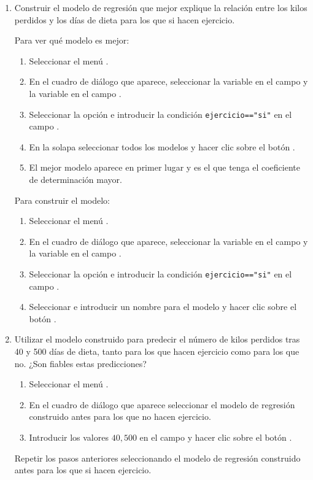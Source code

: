 \begin{enumerate}[leftmargin=*]
\begin{enumerate}
\item Construir el modelo de regresión que mejor explique la relación entre los kilos perdidos y los días de dieta para
los que si hacen ejercicio.
\begin{indicacion}
Para ver qué modelo es mejor:
\begin{enumerate}
\item Seleccionar el menú .
\item En el cuadro de diálogo que aparece, seleccionar la variable  en el campo  y la variable  en el campo .
\item Seleccionar la opción  e introducir la condición \lstinline{ejercicio=="si"} en el campo .
\item En la solapa  seleccionar todos los modelos y hacer clic sobre el botón .
\item El mejor modelo aparece en primer lugar y es el que tenga el coeficiente de determinación mayor.
\end{enumerate}
Para construir el modelo:
\begin{enumerate}
\item Seleccionar el menú .
\item En el cuadro de diálogo que aparece, seleccionar la variable  en el campo  y la variable  en el campo .
\item Seleccionar la opción  e introducir la condición \lstinline{ejercicio=="si"} en el campo .
\item Seleccionar  e introducir un nombre para el modelo y hacer clic sobre el botón .
\end{enumerate}
\end{indicacion}

\item Utilizar el modelo construido para predecir el número de kilos perdidos tras 40 y 500 días de dieta, tanto para
los que hacen ejercicio como para los que no. ¿Son fiables estas predicciones?
\begin{indicacion}
\begin{enumerate}
\item Seleccionar el menú .
\item En el cuadro de diálogo que aparece seleccionar el modelo de regresión construido antes para los que no hacen ejercicio.
\item Introducir los valores $40, 500$ en el campo  y hacer clic sobre el botón .
\end{enumerate}
Repetir los pasos anteriores seleccionando el modelo de regresión construido antes para los que si hacen ejercicio.
\end{indicacion}
\end{enumerate}


\end{enumerate}
